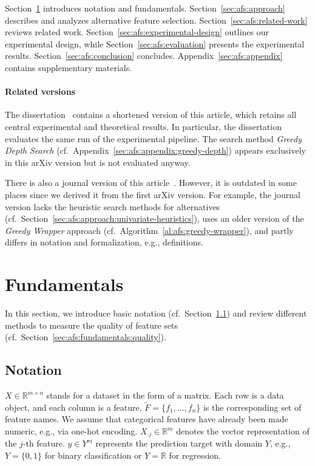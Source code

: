 \documentclass{article}
\theoremstyle{definition}
\begin{document}
Section~\ref{sec:afs:fundamentals} introduces notation and fundamentals.
Section~\ref{sec:afs:approach} describes and analyzes alternative feature selection.
Section~\ref{sec:afs:related-work} reviews related work.
Section~\ref{sec:afs:experimental-design} outlines our experimental design, while Section~\ref{sec:afs:evaluation} presents the experimental results.
Section~\ref{sec:afs:conclusion} concludes.
Appendix~\ref{sec:afs:appendix} contains supplementary materials.

\paragraph{Related versions}

The dissertation~\cite{bach2025leveraging} contains a shortened version of this article, which retains all central experimental and theoretical results.
In particular, the dissertation evaluates the same run of the experimental pipeline.
The search method \emph{Greedy Depth Search} (cf.~Appendix~\ref{sec:afs:appendix:greedy-depth}) appears exclusively in this arXiv version but is not evaluated anyway.

There is also a journal version of this article~\cite{bach2024alternative}.
However, it is outdated in some places since we derived it from the first arXiv version.
For example, the journal version lacks the heuristic search methods for alternatives (cf.~Section~\ref{sec:afs:approach:univariate-heuristics}), uses an older version of the \emph{Greedy Wrapper} approach (cf.~Algorithm~\ref{al:afs:greedy-wrapper}), and partly differs in notation and formalization, e.g., definitions.

\section{Fundamentals}
\label{sec:afs:fundamentals}

In this section, we introduce basic notation (cf.~Section~\ref{sec:afs:fundamentals:notation}) and review different methods to measure the quality of feature sets (cf.~Section~\ref{sec:afs:fundamentals:quality}).

\subsection{Notation}
\label{sec:afs:fundamentals:notation}

$X \in \mathbb{R}^{m \times n}$ stands for a dataset in the form of a matrix.
Each row is a data object, and each column is a feature.
$\tilde{F} = \{f_1, \dots, f_n\}$ is the corresponding set of feature names.
We assume that categorical features have already been made numeric, e.g., via one-hot encoding.
$X_{\cdot{}j} \in \mathbb{R}^m$ denotes the vector representation of the $j$-th feature.
$y \in Y^m$ represents the prediction target with domain $Y$, e.g., $Y=\{0,1\}$ for binary classification or $Y=\mathbb{R}$ for regression.
\end{document}
